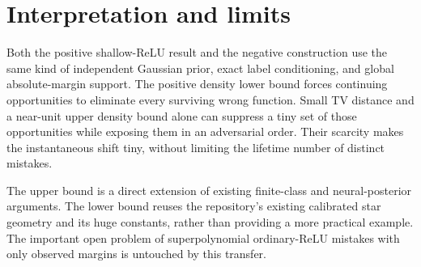 \documentclass[11pt]{article}
\begin{document}
\section{Interpretation and limits}
Both the positive shallow-ReLU result and the negative construction use
the same kind of independent Gaussian prior, exact label conditioning,
and global absolute-margin support. The positive density lower bound
forces continuing opportunities to eliminate every surviving wrong
function. Small TV distance and a near-unit upper density bound alone
can suppress a tiny set of those opportunities while exposing them in
an adversarial order. Their scarcity makes the instantaneous shift tiny,
without limiting the lifetime number of distinct mistakes.

The upper bound is a direct extension of existing finite-class and
neural-posterior arguments. The lower bound reuses the repository's
existing calibrated star geometry and its huge constants, rather than
providing a more practical example. The important open problem of
superpolynomial ordinary-ReLU mistakes with only observed margins is
untouched by this transfer.
\end{document}
